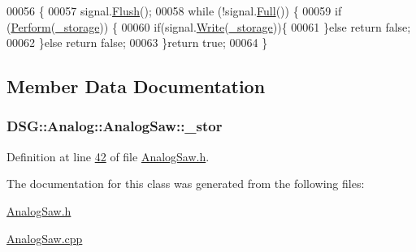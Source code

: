 \begin{DoxyCode}
00056                                                                     \{
00057             signal.\hyperlink{class_d_s_g_1_1_ring_buffer_ab23c8003d2857809a816068eeb209d60}{Flush}();
00058             \textcolor{keywordflow}{while} (!signal.\hyperlink{class_d_s_g_1_1_ring_buffer_a53ddb04ffcbb5470a8d2b0a3c65b70cb}{Full}()) \{
00059                 \textcolor{keywordflow}{if} (\hyperlink{class_d_s_g_1_1_analog_1_1_analog_saw_a8d36e77c09ba84128e786c7bb14cddda}{Perform}(\hyperlink{class_d_s_g_1_1_signal_generator_a28a9b47a1aa0783029f11a19ba0363f2}{\_storage})) \{
00060                     \textcolor{keywordflow}{if}(signal.\hyperlink{class_d_s_g_1_1_ring_buffer_aa5dd2caa0a270173251faee40a43d692}{Write}(\hyperlink{class_d_s_g_1_1_signal_generator_a28a9b47a1aa0783029f11a19ba0363f2}{\_storage}))\{
00061                     \}\textcolor{keywordflow}{else} \textcolor{keywordflow}{return} \textcolor{keyword}{false};
00062                 \}\textcolor{keywordflow}{else} \textcolor{keywordflow}{return} \textcolor{keyword}{false};
00063             \}\textcolor{keywordflow}{return} \textcolor{keyword}{true};
00064         \}
\end{DoxyCode}


\subsection{Member Data Documentation}
\hypertarget{class_d_s_g_1_1_analog_1_1_analog_saw_a81a923800bb8ba0f788d3567d2965d2a}{
\subsubsection[{\+\_\+stor}]{ D\+S\+G\+::\+Analog\+::\+Analog\+Saw\+::\+\_\+stor\hspace{0.3cm}{\ttfamily [protected]}}}\label{class_d_s_g_1_1_analog_1_1_analog_saw_a81a923800bb8ba0f788d3567d2965d2a}


Definition at line \hyperlink{_analog_saw_8h_source_l00042}{42} of file \hyperlink{_analog_saw_8h_source}{Analog\+Saw.\+h}.



The documentation for this class was generated from the following files\+:\begin{DoxyCompactItemize}
\item 
\hyperlink{_analog_saw_8h}{Analog\+Saw.\+h}\item 
\hyperlink{_analog_saw_8cpp}{Analog\+Saw.\+cpp}\end{DoxyCompactItemize}
